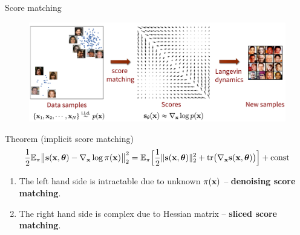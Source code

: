 \begin{frame}{Score matching}
	\vspace{-0.3cm}
	\begin{figure}
		\centering
		\includegraphics[width=0.8\linewidth]{figs/smld}
	\end{figure}
	\vspace{-0.6cm}
	\begin{block}{Theorem (implicit score matching)}
		\vspace{-0.6cm}
		\[
			\frac{1}{2} \mathbb{E}_{\pi}\bigl\| \mathbf{s}(\mathbf{x}, \boldsymbol{\theta}) - \nabla_{\mathbf{x}} \log \pi(\mathbf{x}) \bigr\|^2_2 = \mathbb{E}_{\pi}\Bigr[ \frac{1}{2}\| \mathbf{s}(\mathbf{x}, \boldsymbol{\theta}) \|_2^2 + \text{tr}\bigl(\nabla_{\mathbf{x}} \mathbf{s}(\mathbf{x}, \boldsymbol{\theta})\bigr) \Bigr] + \text{const}
		\]
		\vspace{-0.4cm}
	\end{block}
	\begin{enumerate}
	    \item The left hand side is intractable due to unknown $\pi(\mathbf{x})$ -- \textbf{denoising score matching}. 
	    \item The right hand side is complex due to Hessian matrix -- \textbf{sliced score matching}.
	\end{enumerate}
\end{frame}

